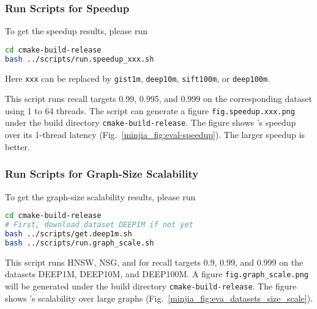 \subsubsection{Run Scripts for Speedup}
To get the speedup results, please run
\begin{lstlisting}[language=bash]
cd cmake-build-release
bash ../scripts/run.speedup_xxx.sh
\end{lstlisting}
Here \verb|xxx| can be replaced by \verb|gist1m|, \verb|deep10m|, \verb|sift100m|, or \verb|deep100m|.

This script runs \Hammer recall targets 0.99, 0.995, and 0.999 on the corresponding dataset using 1 to 64 threads. 
The script can generate a figure \verb|fig.speedup.xxx.png| under the build directory \verb|cmake-build-release|. The figure shows \Hammer's speedup over its 1-thread latency (Fig.~\ref{minjia_fig:eval-speedup}). The larger speedup is better.

\subsubsection{Run Scripts for Graph-Size Scalability}
To get the graph-size scalability results, please run
\begin{lstlisting}[language=bash]
cd cmake-build-release
# First, download dataset DEEP1M if not yet
bash ../scripts/get.deep1m.sh 
bash ../scripts/run.graph_scale.sh
\end{lstlisting}

This script runs HNSW, NSG, and \Hammer for recall targets 0.9, 0.99, and 0.999 on the datasets DEEP1M, DEEP10M, and DEEP100M. 
A figure \verb|fig.graph_scale.png| will be generated under the build directory \verb|cmake-build-release|. The figure shows \Hammer's scalability over large graphs (Fig.~\ref{minjia_fig:eva_datasets_size_scale}). 




